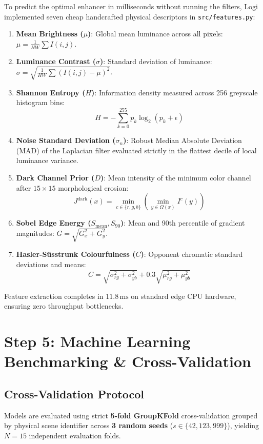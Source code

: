 \documentclass[10pt,a4paper]{article}
\begin{document}
To predict the optimal enhancer in milliseconds without running the filters, Logi implemented seven cheap handcrafted physical descriptors in \texttt{src/features.py}:

\begin{enumerate}[leftmargin=*, nosep]
    \item \textbf{Mean Brightness ($\mu$)}: Global mean luminance across all pixels: $\mu = \frac{1}{HW} \sum I(i, j)$.
    \item \textbf{Luminance Contrast ($\sigma$)}: Standard deviation of luminance: $\sigma = \sqrt{\frac{1}{HW} \sum (I(i, j) - \mu)^2}$.
    \item \textbf{Shannon Entropy ($H$)}: Information density measured across 256 greyscale histogram bins:
    \[ H = -\sum_{k=0}^{255} p_k \log_2(p_k + \epsilon) \]
    \item \textbf{Noise Standard Deviation ($\sigma_n$)}: Robust Median Absolute Deviation (MAD) of the Laplacian filter evaluated strictly in the flattest decile of local luminance variance.
    \item \textbf{Dark Channel Prior ($D$)}: Mean intensity of the minimum color channel after $15 \times 15$ morphological erosion:
    \[ J^{\text{dark}}(x) = \min_{c \in \{r,g,b\}} \left( \min_{y \in \Omega(x)} I^c(y) \right) \]
    \item \textbf{Sobel Edge Energy ($S_{\text{mean}}, S_{90}$)}: Mean and 90th percentile of gradient magnitudes: $G = \sqrt{G_x^2 + G_y^2}$.
    \item \textbf{Hasler-S\"{u}sstrunk Colourfulness ($C$)}: Opponent chromatic standard deviations and means:
    \[ C = \sqrt{\sigma_{rg}^2 + \sigma_{yb}^2} + 0.3 \sqrt{\mu_{rg}^2 + \mu_{yb}^2} \]
\end{enumerate}

Feature extraction completes in \textbf{$11.8\,\text{ms}$} on standard edge CPU hardware, ensuring zero throughput bottlenecks.

\section{Step 5: Machine Learning Benchmarking \& Cross-Validation}

\subsection{Cross-Validation Protocol}
Models are evaluated using strict \textbf{5-fold GroupKFold} cross-validation grouped by physical scene identifier across \textbf{3 random seeds} ($s \in \{42, 123, 999\}$), yielding $N = 15$ independent evaluation folds.
\end{document}
